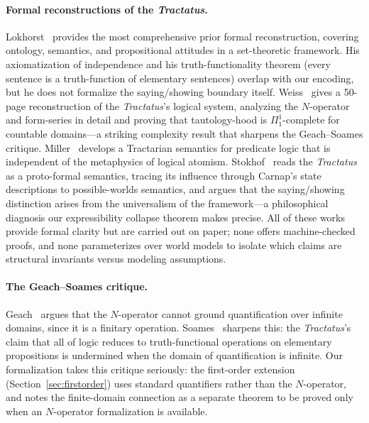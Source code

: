 \documentclass[10pt, letterpaper]{article}
\theoremstyle{definition}
\theoremstyle{remark}
\begin{document}
\paragraph{Formal reconstructions of the \emph{Tractatus}.}
Lokhorst~\cite{lokhorst1988} provides the most comprehensive
prior formal reconstruction, covering ontology, semantics, and
propositional attitudes in a set-theoretic framework.  His
axiomatization of independence and his truth-functionality
theorem (every sentence is a truth-function of elementary
sentences) overlap with our encoding, but he does not formalize
the saying/showing boundary itself.
Weiss~\cite{weiss2017} gives a 50-page reconstruction of the
\emph{Tractatus}'s logical system, analyzing the $N$-operator
and form-series in detail and proving that tautology-hood is
$\Pi^1_1$-complete for countable domains---a striking
complexity result that sharpens the Geach--Soames critique.
Miller~\cite{miller1995} develops a Tractarian semantics for
predicate logic that is independent of the metaphysics of
logical atomism.
Stokhof~\cite{stokhof2008} reads the \emph{Tractatus} as a
proto-formal semantics, tracing its influence through Carnap's
state descriptions to possible-worlds semantics, and argues
that the saying/showing distinction arises from the
universalism of the framework---a philosophical diagnosis our
expressibility collapse theorem makes precise.
All of these works provide formal clarity but are carried out
on paper; none offers machine-checked proofs, and none
parameterizes over world models to isolate which claims are
structural invariants versus modeling assumptions.

\paragraph{The Geach--Soames critique.}
Geach~\cite{geach1981} argues that the $N$-operator cannot
ground quantification over infinite domains, since it is a
finitary operation.  Soames~\cite{soames1983} sharpens this:
the \emph{Tractatus}'s claim that all of logic reduces to
truth-functional operations on elementary propositions is
undermined when the domain of quantification is infinite.
Our formalization takes this critique seriously: the first-order
extension (Section~\ref{sec:firstorder}) uses standard
quantifiers rather than the $N$-operator, and notes the
finite-domain connection as a separate theorem to be proved only
when an $N$-operator formalization is available.
\end{document}
